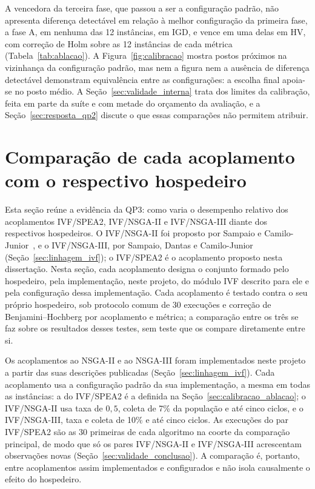A vencedora da terceira fase, que passou a ser a configuração padrão, não apresenta diferença detectável em relação à melhor configuração da primeira fase, a fase A, em nenhuma das 12 instâncias, em IGD, e vence em uma delas em HV, com correção de Holm sobre as 12 instâncias de cada métrica (Tabela~\ref{tab:ablacao}). A Figura~\ref{fig:calibracao} mostra postos próximos na vizinhança da configuração padrão, mas nem a figura nem a ausência de diferença detectável demonstram equivalência entre as configurações: a escolha final apoia-se no posto médio. A Seção~\ref{sec:validade_interna} trata dos limites da calibração, feita em parte da suíte e com metade do orçamento da avaliação, e a Seção~\ref{sec:resposta_qp2} discute o que essas comparações não permitem atribuir.

\section{Comparação de cada acoplamento com o respectivo hospedeiro}
\label{sec:hospedeiros}

Esta seção reúne a evidência da QP3: como varia o desempenho relativo dos acoplamentos IVF/SPEA2, IVF/NSGA-II e IVF/NSGA-III diante dos respectivos hospedeiros. O IVF/NSGA-II foi proposto por Sampaio e Camilo-Junior~\cite{sampaio2017ivf}, e o IVF/NSGA-III, por Sampaio, Dantas e Camilo-Junior~\cite{sampaio2023ivf} (Seção~\ref{sec:linhagem_ivf}); o IVF/SPEA2 é o acoplamento proposto nesta dissertação. Nesta seção, cada acoplamento designa o conjunto formado pelo hospedeiro, pela implementação, neste projeto, do módulo IVF descrito para ele e pela configuração dessa implementação. Cada acoplamento é testado contra o seu próprio hospedeiro, sob protocolo comum de 30 execuções e correção de Benjamini--Hochberg por acoplamento e métrica; a comparação entre os três se faz sobre os resultados desses testes, sem teste que os compare diretamente entre si.

Os acoplamentos ao NSGA-II e ao NSGA-III foram implementados neste projeto a partir das suas descrições publicadas (Seção~\ref{sec:linhagem_ivf}). Cada acoplamento usa a configuração padrão da sua implementação, a mesma em todas as instâncias: a do IVF/SPEA2 é a definida na Seção~\ref{sec:calibracao_ablacao}; o IVF/NSGA-II usa taxa de $0{,}5$, coleta de 7\% da população e até cinco ciclos, e o IVF/NSGA-III, taxa e coleta de 10\% e até cinco ciclos. As execuções do par IVF/SPEA2 são as 30 primeiras de cada algoritmo na coorte da comparação principal, de modo que só os pares IVF/NSGA-II e IVF/NSGA-III acrescentam observações novas (Seção~\ref{sec:validade_conclusao}). A comparação é, portanto, entre acoplamentos assim implementados e configurados e não isola causalmente o efeito do hospedeiro.

